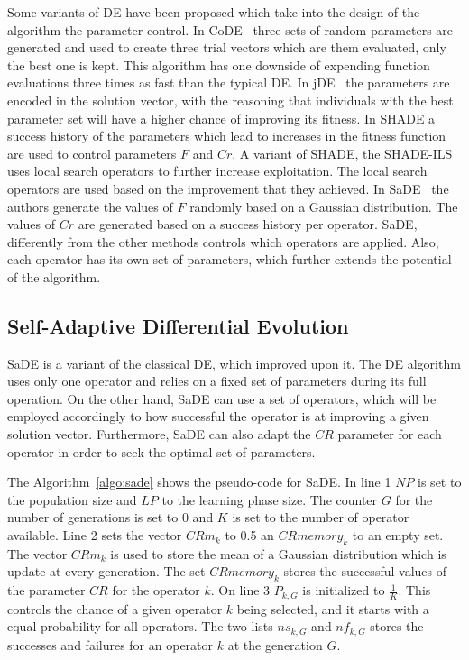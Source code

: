 Some variants of \ac{DE} have been proposed which take into the design of the algorithm
the parameter control. In CoDE~\cite{wang2011differential} three sets of random parameters
are generated and used to create three trial vectors which are them evaluated, only
the best one is kept. This algorithm has one downside of expending function evaluations
three times as fast than the typical \ac{DE}. In jDE~\cite{brest2006self} the parameters
are encoded in the solution vector, with the reasoning that individuals with the best
parameter set will have a higher chance of improving its fitness.
In SHADE\cite{tanabe2013evaluating} a success history of the parameters
which lead to increases in the fitness function are used to control parameters $F$ and $Cr$.
A variant of SHADE, the SHADE-ILS~\cite{molina2018shade} uses local search
operators to further increase exploitation. The local search operators are used based
on the improvement that they achieved. In \ac{SaDE}~\cite{qin2005self,qin2009differential}
the authors generate the values of $F$ randomly based on a Gaussian distribution.
The values of $Cr$ are generated based on a success history per operator. \ac{SaDE},
differently from the other methods controls which operators are applied. Also,
each operator has its own set of parameters, which further extends the
potential of the algorithm.

\subsection{Self-Adaptive Differential Evolution}

\ac{SaDE} is a variant of the classical \ac{DE}, which improved upon it. The \ac{DE} algorithm
uses only one operator and relies on a fixed set of parameters during its full
operation. On the other hand, \ac{SaDE} can use a set of operators, which will
be employed accordingly to how successful the operator is at improving
a given solution vector. Furthermore, \ac{SaDE} can also adapt the $CR$ parameter
for each operator in order to seek the optimal set of parameters.

The Algorithm~\ref{algo:sade} shows the pseudo-code for \ac{SaDE}. In line 1
$NP$ is set to the population size and $LP$ to the learning phase size.
The counter $G$ for the number of generations is set to 0 and
$K$ is set to the number of operator available. Line 2 sets the vector
$CRm_k$ to 0.5 an $CRmemory_k$ to an empty set. The vector $CRm_k$ is used
to store the mean of a Gaussian distribution which is update at every
generation. The set $CRmemory_k$ stores the successful values of the
parameter $CR$ for the operator $k$. On line 3 $P_{k,G}$ is initialized
to $\frac{1}{K}$. This controls the chance of a given operator $k$ being
selected, and it starts with a equal probability for all operators. The
two lists $ns_{k,G}$ and $nf_{k, G}$ stores the successes and failures
for an operator $k$ at the generation $G$.

